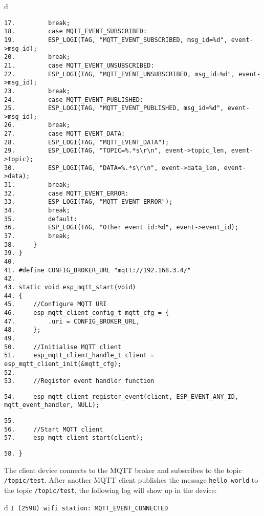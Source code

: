 \documentclass[a4paper,12pt]{book}
\begin{document}
\begin{codebloc}
\begin{tabular}{d}
\vspace{2pt}
\begin{verbatim}
17.         break;
18.         case MQTT_EVENT_SUBSCRIBED:
19.         ESP_LOGI(TAG, "MQTT_EVENT_SUBSCRIBED, msg_id=%d", event->msg_id);
20.         break;
21.         case MQTT_EVENT_UNSUBSCRIBED:
22.         ESP_LOGI(TAG, "MQTT_EVENT_UNSUBSCRIBED, msg_id=%d", event->msg_id);
23.         break;
24.         case MQTT_EVENT_PUBLISHED:
25.         ESP_LOGI(TAG, "MQTT_EVENT_PUBLISHED, msg_id=%d", event->msg_id);
26.         break;
27.         case MQTT_EVENT_DATA:
28.         ESP_LOGI(TAG, "MQTT_EVENT_DATA");
29.         ESP_LOGI(TAG, "TOPIC=%.*s\r\n", event->topic_len, event->topic);
30.         ESP_LOGI(TAG, "DATA=%.*s\r\n", event->data_len, event->data);
31.         break;
32.         case MQTT_EVENT_ERROR:
33.         ESP_LOGI(TAG, "MQTT_EVENT_ERROR");
34.         break;
35.         default:
36.         ESP_LOGI(TAG, "Other event id:%d", event->event_id);
37.         break;
38.     }
39. }
40.
41. #define CONFIG_BROKER_URL "mqtt://192.168.3.4/"
42.
43. static void esp_mqtt_start(void)
44. {
45.     //Configure MQTT URI
46.     esp_mqtt_client_config_t mqtt_cfg = {
47.         .uri = CONFIG_BROKER_URL,
48.     };
49.
50.     //Initialise MQTT client
51.     esp_mqtt_client_handle_t client = esp_mqtt_client_init(&mqtt_cfg);
52.
53.     //Register event handler function
\end{verbatim}
\verb|54.     |\fontsize{8.5pt}{8.5pt}\selectfont\verb|esp_mqtt_client_register_event(client, ESP_EVENT_ANY_ID, mqtt_event_handler, NULL);|
\footnotesize
\begin{verbatim}
55.
56.     //Start MQTT client
57.     esp_mqtt_client_start(client);
\end{verbatim}
\verb|58. }|
\end{tabular}
\end{codebloc}

The client device connects to the MQTT broker and subscribes to the topic \verb|/topic/test|. After another MQTT client publishes the message \verb|hello world| to the topic \verb|/topic/test|, the following log will show up in the device:

\begin{codebloc}
\begin{tabular}{d}
\verb|I (2598) wifi station: MQTT_EVENT_CONNECTED|
\end{tabular}
\end{codebloc}
\end{document}
